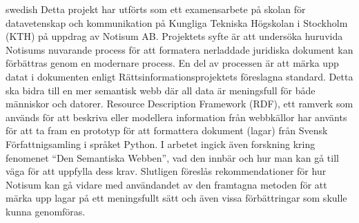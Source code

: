 \begin{foreignabstract}{swedish}
Detta projekt har utförts som ett examensarbete på skolan för datavetenskap och kommunikation på Kungliga Tekniska Högskolan i Stockholm (KTH) på uppdrag av Notisum AB. Projektets syfte är att undersöka huruvida Notisums nuvarande process för att formatera nerladdade juridiska dokument kan förbättras genom en modernare process. En del av processen är att märka upp datat i dokumenten enligt Rättsinformationsprojektets föreslagna standard. Detta ska bidra till en mer semantisk webb där all data är meningsfull för både människor och datorer. Resource Description Framework (RDF), ett ramverk som används för att beskriva eller modellera information från webbkällor har använts för att ta fram en prototyp för att formattera dokument (lagar) från Svensk Författnigsamling i språket Python. I arbetet ingick även forskning kring fenomenet “Den Semantiska Webben”, vad den innbär och hur man kan gå till väga för att uppfylla dess krav. Slutligen föreslås rekommendationer för hur Notisum kan gå vidare med användandet av den  framtagna metoden för att märka upp lagar på ett meningsfullt sätt och även vissa förbättringar som skulle kunna genomföras. 
\end{foreignabstract}
